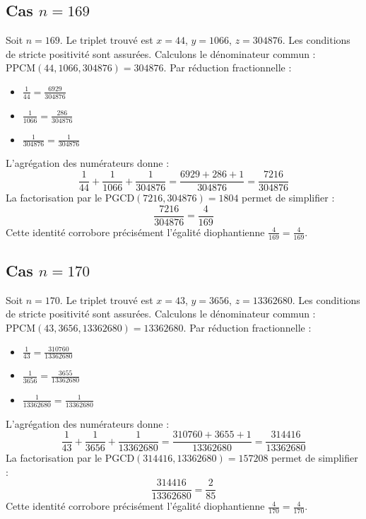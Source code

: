 \documentclass[11pt,a4paper]{article}
\begin{document}
\subsection{Cas $n = 169$}
Soit $n = 169$. Le triplet trouvé est $x = 44$, $y = 1066$, $z = 304876$.
Les conditions de stricte positivité sont assurées.
Calculons le dénominateur commun : $\text{PPCM}(44, 1066, 304876) = 304876$.
Par réduction fractionnelle :
\begin{itemize}
    \item $\frac{1}{44} = \frac{6929}{304876}$
    \item $\frac{1}{1066} = \frac{286}{304876}$
    \item $\frac{1}{304876} = \frac{1}{304876}$
\end{itemize}
L'agrégation des numérateurs donne :
$$ \frac{1}{44} + \frac{1}{1066} + \frac{1}{304876} = \frac{6929 + 286 + 1}{304876} = \frac{7216}{304876} $$
La factorisation par le $\text{PGCD}(7216, 304876) = 1804$ permet de simplifier :
$$ \frac{7216}{304876} = \frac{4}{169} $$
Cette identité corrobore précisément l'égalité diophantienne $\frac{4}{169} = \frac{4}{169}$.

\subsection{Cas $n = 170$}
Soit $n = 170$. Le triplet trouvé est $x = 43$, $y = 3656$, $z = 13362680$.
Les conditions de stricte positivité sont assurées.
Calculons le dénominateur commun : $\text{PPCM}(43, 3656, 13362680) = 13362680$.
Par réduction fractionnelle :
\begin{itemize}
    \item $\frac{1}{43} = \frac{310760}{13362680}$
    \item $\frac{1}{3656} = \frac{3655}{13362680}$
    \item $\frac{1}{13362680} = \frac{1}{13362680}$
\end{itemize}
L'agrégation des numérateurs donne :
$$ \frac{1}{43} + \frac{1}{3656} + \frac{1}{13362680} = \frac{310760 + 3655 + 1}{13362680} = \frac{314416}{13362680} $$
La factorisation par le $\text{PGCD}(314416, 13362680) = 157208$ permet de simplifier :
$$ \frac{314416}{13362680} = \frac{2}{85} $$
Cette identité corrobore précisément l'égalité diophantienne $\frac{4}{170} = \frac{4}{170}$.
\end{document}
